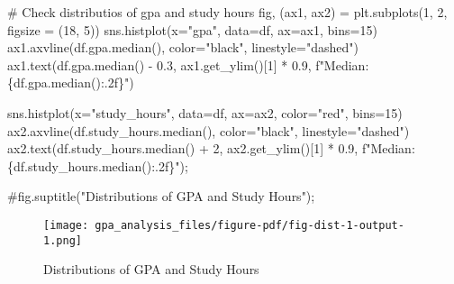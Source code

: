 \documentclass[
  letterpaper,
  DIV=11,
  numbers=noendperiod]{scrreprt}
\newenvironment{Shaded}{\begin{snugshade}}{\end{snugshade}}
\newcommand{\CommentTok}[1]{\textcolor[rgb]{0.37,0.37,0.37}{#1}}
\newcommand{\DecValTok}[1]{\textcolor[rgb]{0.68,0.00,0.00}{#1}}
\newcommand{\FloatTok}[1]{\textcolor[rgb]{0.68,0.00,0.00}{#1}}
\newcommand{\NormalTok}[1]{\textcolor[rgb]{0.00,0.23,0.31}{#1}}
\newcommand{\OperatorTok}[1]{\textcolor[rgb]{0.37,0.37,0.37}{#1}}
\newcommand{\SpecialCharTok}[1]{\textcolor[rgb]{0.37,0.37,0.37}{#1}}
\newcommand{\SpecialStringTok}[1]{\textcolor[rgb]{0.13,0.47,0.30}{#1}}
\newcommand{\StringTok}[1]{\textcolor[rgb]{0.13,0.47,0.30}{#1}}
\begin{document}
\begin{Shaded}
\begin{Highlighting}[]
\CommentTok{\# Check distributios of gpa and study hours}
\NormalTok{fig, (ax1, ax2) }\OperatorTok{=}\NormalTok{ plt.subplots(}\DecValTok{1}\NormalTok{, }\DecValTok{2}\NormalTok{, figsize }\OperatorTok{=}\NormalTok{ (}\DecValTok{18}\NormalTok{, }\DecValTok{5}\NormalTok{))}
\NormalTok{sns.histplot(x}\OperatorTok{=}\StringTok{"gpa"}\NormalTok{, data}\OperatorTok{=}\NormalTok{df, ax}\OperatorTok{=}\NormalTok{ax1, bins}\OperatorTok{=}\DecValTok{15}\NormalTok{)}
\NormalTok{ax1.axvline(df.gpa.median(), color}\OperatorTok{=}\StringTok{"black"}\NormalTok{, linestyle}\OperatorTok{=}\StringTok{"dashed"}\NormalTok{)}
\NormalTok{ax1.text(df.gpa.median() }\OperatorTok{{-}} \FloatTok{0.3}\NormalTok{, ax1.get\_ylim()[}\DecValTok{1}\NormalTok{] }\OperatorTok{*} \FloatTok{0.9}\NormalTok{, }\SpecialStringTok{f"Median: }\SpecialCharTok{\{}\NormalTok{df}\SpecialCharTok{.}\NormalTok{gpa}\SpecialCharTok{.}\NormalTok{median()}\SpecialCharTok{:.2f\}}\SpecialStringTok{"}\NormalTok{)}

\NormalTok{sns.histplot(x}\OperatorTok{=}\StringTok{"study\_hours"}\NormalTok{, data}\OperatorTok{=}\NormalTok{df, ax}\OperatorTok{=}\NormalTok{ax2, color}\OperatorTok{=}\StringTok{"red"}\NormalTok{, bins}\OperatorTok{=}\DecValTok{15}\NormalTok{)}
\NormalTok{ax2.axvline(df.study\_hours.median(), color}\OperatorTok{=}\StringTok{"black"}\NormalTok{, linestyle}\OperatorTok{=}\StringTok{"dashed"}\NormalTok{)}
\NormalTok{ax2.text(df.study\_hours.median() }\OperatorTok{+} \DecValTok{2}\NormalTok{, ax2.get\_ylim()[}\DecValTok{1}\NormalTok{] }\OperatorTok{*} \FloatTok{0.9}\NormalTok{, }\SpecialStringTok{f"Median: }\SpecialCharTok{\{}\NormalTok{df}\SpecialCharTok{.}\NormalTok{study\_hours}\SpecialCharTok{.}\NormalTok{median()}\SpecialCharTok{:.2f\}}\SpecialStringTok{"}\NormalTok{)}\OperatorTok{;}

\CommentTok{\#fig.suptitle("Distributions of GPA and Study Hours");}
\end{Highlighting}
\end{Shaded}

\begin{figure}[H]

{\centering \texttt{[image: gpa\_analysis\_files/figure-pdf/fig-dist-1-output-1.png]}

}

\caption{\label{fig-dist-1}Distributions of GPA and Study Hours}

\end{figure}
\end{document}
